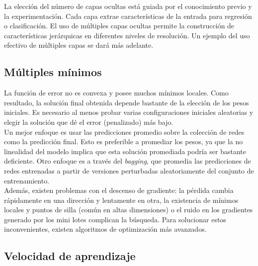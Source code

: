 La elección del número de capas ocultas está guiada por el conocimiento previo y la experimentación. Cada capa extrae características de la entrada para regresión o clasificación. El uso de múltiples capas ocultas permite la construcción de características jerárquicas en diferentes niveles de resolución. Un ejemplo del uso efectivo de múltiples capas se dará más adelante.

\subsection{Múltiples mínimos}

La función de error no es convexa y posee muchos mínimos locales. Como resultado, la solución final obtenida depende bastante de la elección de los pesos iniciales. Es necesario al menos probar varias configuraciones iniciales aleatorias y elegir la solución que dé el error (penalizado) más bajo. \\

Un mejor enfoque es usar las predicciones promedio sobre la colección de redes como la predicción final. Esto es preferible a promediar los pesos, ya que la no linealidad del modelo implica que esta solución promediada podría ser bastante deficiente. Otro enfoque es a través del \textit{bagging}, que promedia las predicciones de redes entrenadas a partir de versiones perturbadas aleatoriamente del conjunto de entrenamiento. \\

Además, existen problemas con el descenso de gradiente: la pérdida cambia rápidamente en una dirección y lentamente en otra, la existencia de mínimos locales y puntos de silla (común en altas dimensiones) o el ruido en los gradientes generado por los mini lotes complican la búsqueda. Para solucionar estos inconvenientes, existen algoritmos de optimización más avanzados.

\subsection{Velocidad de aprendizaje}

